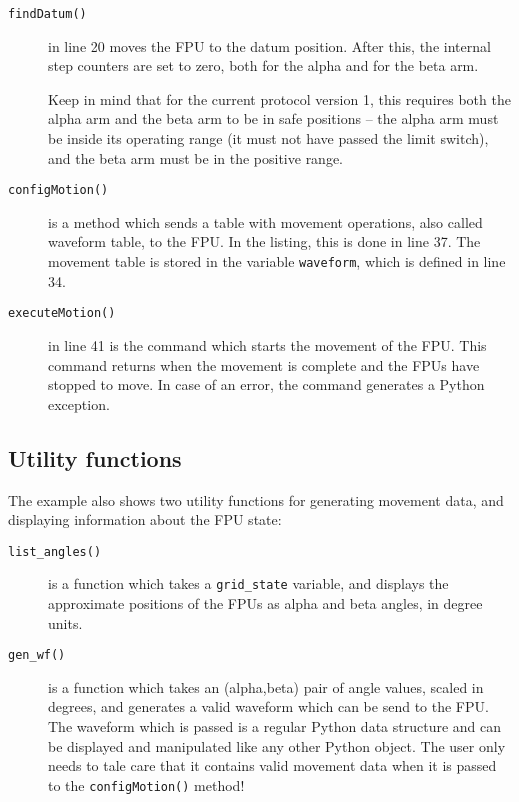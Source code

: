 \documentclass{scrartcl}[12pt,a4paper]
\begin{document}
\begin{description}
\item[\texttt{findDatum()}] in line 20 moves the FPU to the datum
  position. After this, the internal step counters are set to zero,
  both for the alpha and for the beta arm.

  Keep in mind that for the current protocol version 1, this requires
  both the alpha arm and the beta arm to be in safe positions -- the
  alpha arm must be inside its operating range (it must not have
  passed the limit switch), and the beta arm must be in the positive
  range.

\item[\texttt{configMotion()}] is a method which sends a table with movement
  operations, also called waveform table, to the FPU. In the listing,
  this is done in line 37. The movement table is stored in the
  variable \texttt{waveform}, which is defined in line 34.

\item[\texttt{executeMotion()}] in line 41 is the command which starts
  the movement of the FPU. This command returns when the movement is
  complete and the FPUs have stopped to move. In case of an error, the
  command generates a Python exception.

\end{description}

\subsection{Utility functions}

The example also shows two utility functions for generating movement
data, and displaying information about the FPU state:

\begin{description}
\item[\texttt{list\_angles()}] is a function which takes a \texttt{grid\_state}
  variable, and displays the approximate positions of the FPUs as
  alpha and beta angles, in degree units.

\item[\texttt{gen\_wf()}] is a function which takes an (alpha,beta)
  pair of angle values, scaled in degrees, and generates a valid
  waveform which can be send to the FPU.  The waveform which is passed
  is a regular Python data structure and can be displayed and
  manipulated like any other Python object.  The user only needs to
  tale care that it contains valid movement data when it is passed to
  the \texttt{configMotion()} method!

\end{description}
\end{document}
